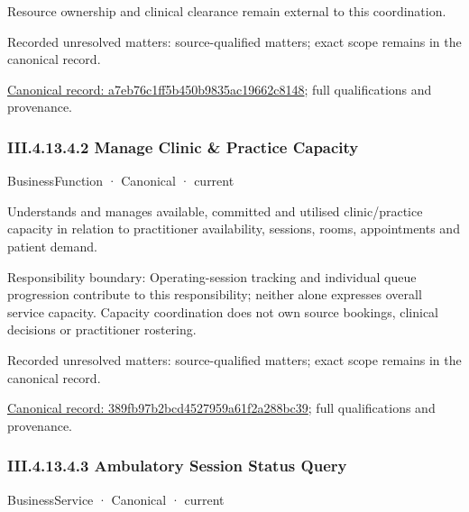Resource ownership and clinical clearance remain external to this coordination.


{\small Recorded unresolved matters: source-qualified matters; exact scope remains in the canonical record.}\par
{\footnotesize \href{../../../../../../../../continuum/business/business-function/a7eb76c1ff5b450b9835ac19662c8148.md}{Canonical record: a7eb76c1ff5b450b9835ac19662c8148}; full qualifications and provenance.}\par
\subsubsection*{III.4.13.4.2 Manage Clinic \& Practice Capacity}
\label{navigation:III.4.13.4.2}

\label{element:389fb97b2bcd4527959a61f2a288bc39}
{\small BusinessFunction · Canonical · current}\par

Understands and manages available, committed and utilised clinic/practice capacity in relation to practitioner availability, sessions, rooms, appointments and patient demand.



Responsibility boundary: Operating-session tracking and individual queue progression contribute to this responsibility; neither alone expresses overall service capacity. Capacity coordination does not own source bookings, clinical decisions or practitioner rostering.


{\small Recorded unresolved matters: source-qualified matters; exact scope remains in the canonical record.}\par
{\footnotesize \href{../../../../../../../../continuum/business/business-function/389fb97b2bcd4527959a61f2a288bc39.md}{Canonical record: 389fb97b2bcd4527959a61f2a288bc39}; full qualifications and provenance.}\par
\subsubsection*{III.4.13.4.3 Ambulatory Session Status Query}
\label{navigation:III.4.13.4.3}

\label{element:a790a785f2e148d7a1c99655d53db4e9}
{\small BusinessService · Canonical · current}\par


